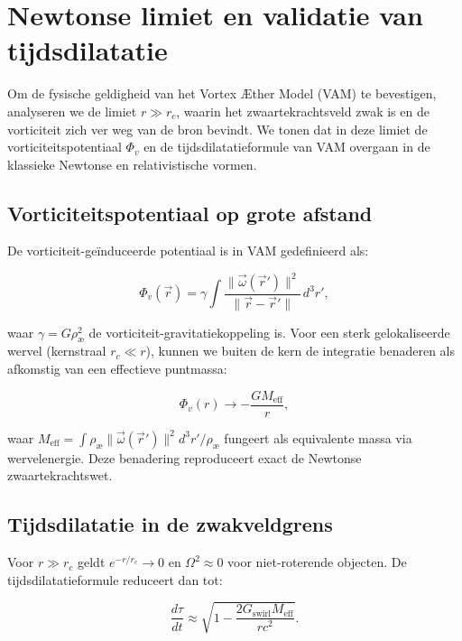 
\section{Newtonse limiet en validatie van tijdsdilatatie}

Om de fysische geldigheid van het Vortex Æther Model (VAM) te bevestigen, analyseren we de limiet $r \gg r_c$, waarin het zwaartekrachtsveld zwak is en de vorticiteit zich ver weg van de bron bevindt. We tonen dat in deze limiet de vorticiteitspotentiaal $\Phi_v$ en de tijdsdilatatieformule van VAM overgaan in de klassieke Newtonse en relativistische vormen.

\subsection{Vorticiteitspotentiaal op grote afstand}

De vorticiteit-geïnduceerde potentiaal is in VAM gedefinieerd als:

\begin{equation}
\Phi_v(\vec{r}) = \gamma \int \frac{\|\vec{\omega}(\vec{r}')\|^2}{\|\vec{r} - \vec{r}'\|} \, d^3r',
\end{equation}

waar $\gamma = G \rho_\text{æ}^2$ de vorticiteit-gravitatiekoppeling is. Voor een sterk gelokaliseerde wervel (kernstraal $r_c \ll r$), kunnen we buiten de kern de integratie benaderen als afkomstig van een effectieve puntmassa:

\begin{equation}
\Phi_v(r) \to -\frac{G M_{\text{eff}}}{r},
\end{equation}

waar $M_{\text{eff}} = \int \rho_\text{æ} \|\vec{\omega}(\vec{r}')\|^2 d^3r' / \rho_\text{æ}$ fungeert als equivalente massa via wervelenergie. Deze benadering reproduceert exact de Newtonse zwaartekrachtswet.

\subsection{Tijdsdilatatie in de zwakveldgrens}

Voor $r \gg r_c$ geldt $e^{-r/r_c} \to 0$ en $\Omega^2 \approx 0$ voor niet-roterende objecten. De tijdsdilatatieformule reduceert dan tot:

\begin{equation}
\frac{d\tau}{dt} \approx \sqrt{1 - \frac{2 G_{\text{swirl}} M_{\text{eff}}}{r c^2}}.
\end{equation}


